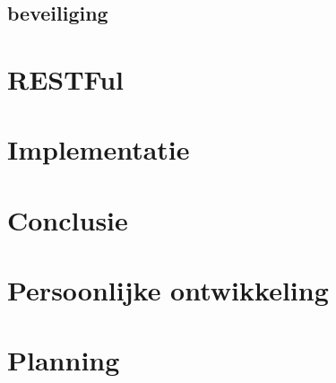 \documentclass[a4paper,11pt,oneside]{report}
\begin{document}
\section{beveiliging}
\chapter{RESTFul}



\chapter{Implementatie}











\chapter{Conclusie}




\appendix
\chapter{Persoonlijke ontwikkeling}
\lipsum[1]

\chapter{Planning}
  \label{chap:planning}


\newpage

\printglossary


\renewcommand{\bibname}{Bronvermeldingen}



\nocite{*}

\end{document}
